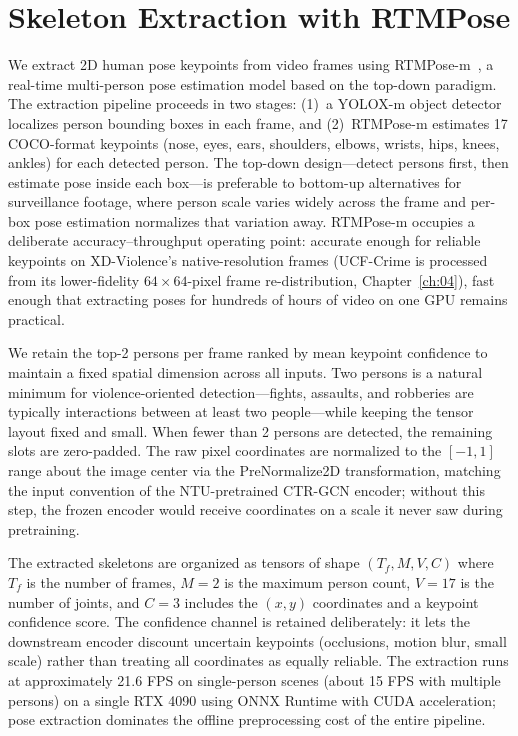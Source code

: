 \section{Skeleton Extraction with RTMPose}
\label{sec:meth-skeleton}

We extract 2D human pose keypoints from video frames using RTMPose-m~\cite{jiang2023rtmpose}, a
real-time multi-person pose estimation model based on the top-down paradigm. The extraction
pipeline proceeds in two stages: (1)~a YOLOX-m object detector localizes person bounding boxes in
each frame, and (2)~RTMPose-m estimates 17 COCO-format keypoints (nose, eyes, ears, shoulders,
elbows, wrists, hips, knees, ankles) for each detected person. The top-down design---detect
persons first, then estimate pose inside each box---is preferable to bottom-up alternatives for
surveillance footage, where person scale varies widely across the frame and per-box pose
estimation normalizes that variation away. RTMPose-m occupies a deliberate accuracy--throughput
operating point: accurate enough for reliable keypoints on XD-Violence's native-resolution frames
(UCF-Crime is processed from its lower-fidelity $64\times64$-pixel frame re-distribution,
Chapter~\ref{ch:04}), fast enough that extracting poses for hundreds of hours of video on one GPU
remains practical.

We retain the top-2 persons per frame ranked by mean keypoint confidence to maintain a fixed
spatial dimension across all inputs. Two persons is a natural minimum for violence-oriented
detection---fights, assaults, and robberies are typically interactions between at least two
people---while keeping the tensor layout fixed and small. When fewer than 2 persons are detected,
the remaining slots are zero-padded. The raw pixel coordinates are normalized to the $[-1, 1]$
range about the image center via the PreNormalize2D transformation, matching the input convention
of the NTU-pretrained CTR-GCN encoder; without this step, the frozen encoder would receive
coordinates on a scale it never saw during pretraining.

The extracted skeletons are organized as tensors of shape $(T_f, M, V, C)$ where $T_f$ is the
number of frames, $M=2$ is the maximum person count, $V=17$ is the number of joints, and $C=3$
includes the $(x, y)$ coordinates and a keypoint confidence score. The confidence channel is
retained deliberately: it lets the downstream encoder discount uncertain keypoints (occlusions,
motion blur, small scale) rather than treating all coordinates as equally reliable. The
extraction runs at approximately 21.6 FPS on single-person scenes (about 15 FPS with multiple
persons) on a single RTX 4090 using ONNX Runtime with CUDA acceleration; pose extraction
dominates the offline preprocessing cost of the entire pipeline.

